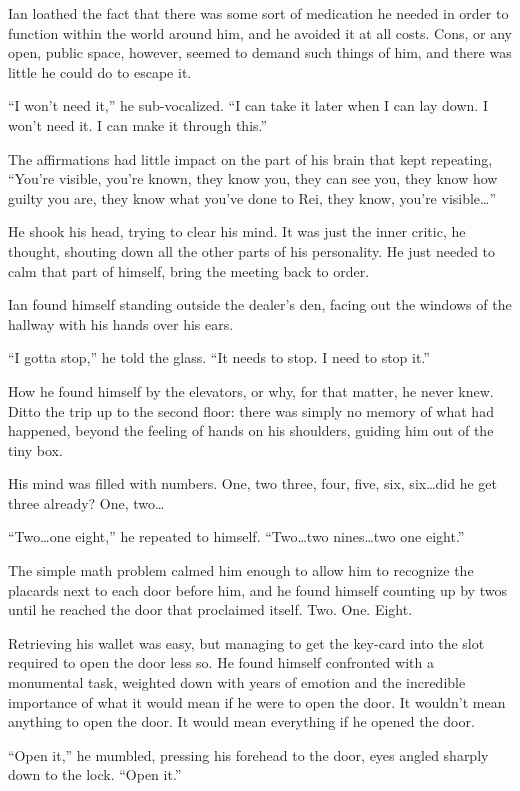 Ian loathed the fact that there was some sort of medication he needed in order to function within the world around him, and he avoided it at all costs. Cons, or any open, public space, however, seemed to demand such things of him, and there was little he could do to escape it.

``I won't need it,'' he sub-vocalized. ``I can take it later when I can lay down. I won't need it. I can make it through this.''

The affirmations had little impact on the part of his brain that kept repeating, ``You're visible, you're known, they know you, they can see you, they know how guilty you are, they know what you've done to Rei, they know, you're visible\ldots{}''

He shook his head, trying to clear his mind.  It was just the inner critic, he thought, shouting down all the other parts of his personality.  He just needed to calm that part of himself, bring the meeting back to order.

Ian found himself standing outside the dealer's den, facing out the windows of the hallway with his hands over his ears.

``I gotta stop,'' he told the glass. ``It needs to stop. I need to stop it.''

How he found himself by the elevators, or why, for that matter, he never knew. Ditto the trip up to the second floor: there was simply no memory of what had happened, beyond the feeling of hands on his shoulders, guiding him out of the tiny box.

His mind was filled with numbers.  One, two three, four, five, six, six\ldots{}did he get three already?  One, two\ldots{}

``Two\ldots{}one eight,'' he repeated to himself. ``Two\ldots{}two nines\ldots{}two one eight.''

The simple math problem calmed him enough to allow him to recognize the placards next to each door before him, and he found himself counting up by twos until he reached the door that proclaimed itself. Two. One. Eight.

Retrieving his wallet was easy, but managing to get the key-card into the slot required to open the door less so. He found himself confronted with a monumental task, weighted down with years of emotion and the incredible importance of what it would mean if he were to open the door. It wouldn't mean anything to open the door.  It would mean everything if he opened the door.

``Open it,'' he mumbled, pressing his forehead to the door, eyes angled sharply down to the lock. ``Open it.''

